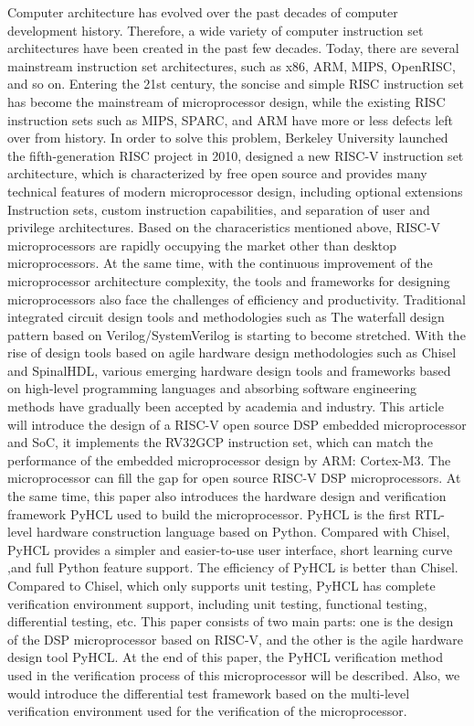 	Computer architecture has evolved over the past decades of computer development history. Therefore, a wide variety of computer instruction set architectures have been created in the past few decades. Today, there are several mainstream instruction set architectures, such as x86, ARM, MIPS, OpenRISC, and so on. Entering the 21st century, the soncise and simple RISC instruction set has become the mainstream of microprocessor design, while the existing RISC instruction sets such as MIPS, SPARC, and ARM have more or less defects left over from history. In order to solve this problem, Berkeley University launched the fifth-generation RISC project in 2010, designed a new RISC-V instruction set architecture, which is characterized by free open source and provides many technical features of modern microprocessor design, including optional extensions Instruction sets, custom instruction capabilities, and separation of user and privilege architectures. Based on the characeristics mentioned above, RISC-V microprocessors are rapidly occupying the market other than desktop microprocessors. At the same time, with the continuous improvement of the microprocessor architecture complexity, the tools and frameworks for designing microprocessors also face the challenges of efficiency and productivity. Traditional integrated circuit design tools and methodologies such as The waterfall design pattern based on Verilog/SystemVerilog is starting to become stretched. With the rise of design tools based on agile hardware design methodologies such as Chisel and SpinalHDL, various emerging hardware design tools and frameworks based on high-level programming languages ​​and absorbing software engineering methods have gradually been accepted by academia and industry. This article will introduce the design of a RISC-V open source DSP embedded microprocessor and SoC, it implements the RV32GCP instruction set, which can match the performance of the embedded microprocessor design by ARM: Cortex-M3. The microprocessor can fill the gap for open source RISC-V DSP microprocessors. At the same time, this paper also introduces the hardware design and verification framework PyHCL used to build the microprocessor. PyHCL is the first RTL-level hardware construction language based on Python. Compared with Chisel, PyHCL provides a simpler and easier-to-use user interface, short learning curve ,and full Python feature support. The efficiency of PyHCL is better than Chisel. Compared to Chisel, which only supports unit testing, PyHCL has complete verification environment support, including unit testing, functional testing, differential testing, etc. This paper consists of two main parts: one is the design of the DSP microprocessor based on RISC-V, and the other is the agile hardware design tool PyHCL. At the end of this paper, the PyHCL verification method used in the verification process of this microprocessor will be described. Also, we would introduce the differential test framework based on the multi-level verification environment used for the verification of the microprocessor.

